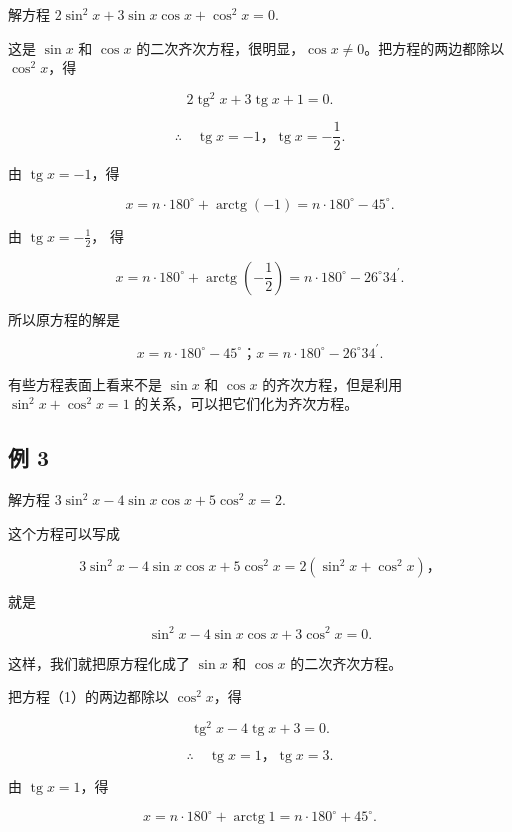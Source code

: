解方程 \(2\sin^2 x + 3\sin x\cos x + \cos^2 x = 0.\)

 这是 \(\sin x\) 和 \(\cos x\)
的二次齐次方程，很明显，\(\cos x \neq 0\)。把方程的两边都除以
\(\cos^2 x\)，得

\[
2 \operatorname{tg} ^ {2} x + 3 \operatorname{tg} x + 1 = 0.
\]

\[
\therefore \quad \operatorname{tg} x = - 1\text{，} \operatorname{tg} x = - \frac {1}{2}.
\]

由 \(\operatorname{tg} x = -1\)，得

\[
x = n \cdot 180 ^{\circ} + \operatorname{arctg} (- 1) = n \cdot 180 ^{\circ} - 45 ^{\circ}.
\]

由 \(\operatorname{tg} x = -\frac{1}{2}\)， 得

\[
x = n \cdot 180 ^{\circ} + \operatorname{arctg} \left(- \frac {1}{2}\right) = n \cdot 180 ^{\circ} - 26 ^{\circ} 34 ^{\prime}.
\]

所以原方程的解是

\[
x = n \cdot 180 ^{\circ} - 45 ^{\circ}\text{；} x = n \cdot 180 ^{\circ} - 26 ^{\circ} 34 ^{\prime}.
\]

有些方程表面上看来不是 \(\sin x\) 和 \(\cos x\) 的齐次方程，但是利用
\(\sin^2 x + \cos^2 x = 1\) 的关系，可以把它们化为齐次方程。

\subsection{例 3}

解方程 \(3\sin^{2}x-4\sin x\cos x+5\cos^{2}x=2.\)

 这个方程可以写成

\[
3 \sin^ {2} x - 4 \sin x \cos x + 5 \cos^ {2} x = 2 (\sin^ {2} x + \cos^ {2} x)\text{，}
\]

就是

\[
\sin^ {2} x - 4 \sin x \cos x + 3 \cos^ {2} x = 0. \tag {1}
\]

这样，我们就把原方程化成了 \(\sin x\) 和 \(\cos x\) 的二次齐次方程。

把方程（1）的两边都除以 \(\cos^2 x\)，得

\[
\operatorname{tg} ^ {2} x - 4 \operatorname{tg} x + 3 = 0.
\]

\[
\therefore \quad \operatorname{tg} x = 1\text{，} \operatorname{tg} x = 3.
\]

由 \(\operatorname{tg} x = 1\)，得

\[
x = n \cdot 180 ^{\circ} + \operatorname{arctg} 1 = n \cdot 180 ^{\circ} + 45 ^{\circ}.
\]


